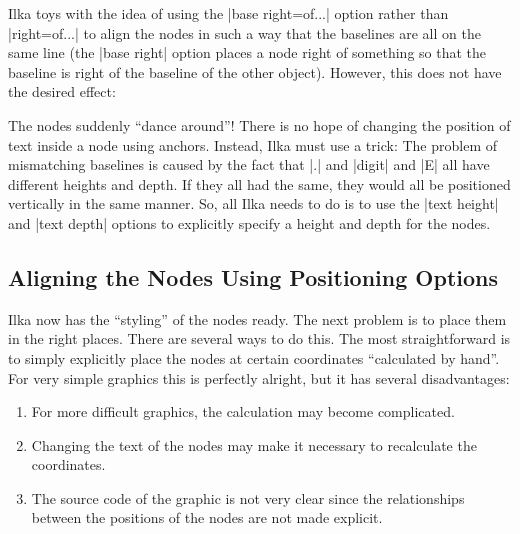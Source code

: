 Ilka toys with the idea of using the |base right=of...| option rather than
|right=of...| to align the nodes in such a way that the baselines are all on
the same line (the |base right| option places a node right of something so that
the baseline is right of the baseline of the other object). However, this does
not have the desired effect:
%
\begin{codeexample}[preamble={\usetikzlibrary{positioning,shapes.misc}}]
\end{codeexample}
%
The nodes suddenly ``dance around''! There is no hope of changing the position
of text inside a node using anchors. Instead, Ilka must use a trick: The
problem of mismatching baselines is caused by the fact that |.| and |digit| and
|E| all have different heights and depth. If they all had the same, they would
all be positioned vertically in the same manner. So, all Ilka needs to do is to
use the |text height| and |text depth| options to explicitly specify a height
and depth for the nodes.
%
\begin{codeexample}[preamble={\usetikzlibrary{positioning,shapes.misc}}]
\end{codeexample}


\subsection{Aligning the Nodes Using Positioning Options}

Ilka now has the ``styling'' of the nodes ready. The next problem is to place
them in the right places. There are several ways to do this. The most
straightforward is to simply explicitly place the nodes at certain coordinates
``calculated by hand''. For very simple graphics this is perfectly alright, but
it has several disadvantages:
%
\begin{enumerate}
    \item For more difficult graphics, the calculation may become
        complicated.
    \item Changing the text of the nodes may make it necessary to recalculate
        the coordinates.
    \item The source code of the graphic is not very clear since the
        relationships between the positions of the nodes are not made
        explicit.
\end{enumerate}

